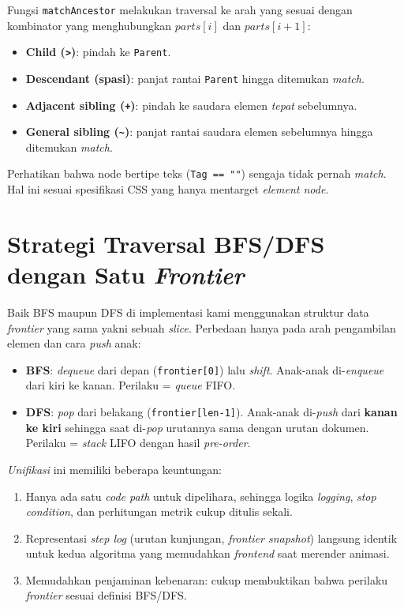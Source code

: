 Fungsi \texttt{matchAncestor} melakukan traversal ke arah yang sesuai dengan kombinator yang menghubungkan $\mathit{parts}[i]$ dan $\mathit{parts}[i+1]$:

\begin{itemize}
    \item \textbf{Child (\texttt{>})}: pindah ke \texttt{Parent}.
    \item \textbf{Descendant (spasi)}: panjat rantai \texttt{Parent} hingga ditemukan \textit{match}.
    \item \textbf{Adjacent sibling (\texttt{+})}: pindah ke saudara elemen \textit{tepat} sebelumnya.
    \item \textbf{General sibling (\texttt{\textasciitilde})}: panjat rantai saudara elemen sebelumnya hingga ditemukan \textit{match}.
\end{itemize}

Perhatikan bahwa node bertipe teks (\texttt{Tag == ""}) sengaja tidak pernah \textit{match}. Hal ini sesuai spesifikasi CSS yang hanya mentarget \textit{element node}.

\section{Strategi Traversal BFS/DFS dengan Satu \textit{Frontier}}

Baik BFS maupun DFS di implementasi kami menggunakan struktur data \textit{frontier} yang sama yakni sebuah \textit{slice}. Perbedaan hanya pada arah pengambilan elemen dan cara \textit{push} anak:

\begin{itemize}
    \item \textbf{BFS}: \textit{dequeue} dari depan (\texttt{frontier[0]}) lalu \textit{shift}. Anak-anak di-\textit{enqueue} dari kiri ke kanan. Perilaku = \textit{queue} FIFO.
    \item \textbf{DFS}: \textit{pop} dari belakang (\texttt{frontier[len-1]}). Anak-anak di-\textit{push} dari \textbf{kanan ke kiri} sehingga saat di-\textit{pop} urutannya sama dengan urutan dokumen. Perilaku = \textit{stack} LIFO dengan hasil \textit{pre-order}.
\end{itemize}

\textit{Unifikasi} ini memiliki beberapa keuntungan:
\begin{enumerate}
    \item Hanya ada satu \textit{code path} untuk dipelihara, sehingga logika \textit{logging}, \textit{stop condition}, dan perhitungan metrik cukup ditulis sekali.
    \item Representasi \textit{step log} (urutan kunjungan, \textit{frontier snapshot}) langsung identik untuk kedua algoritma yang memudahkan \textit{frontend} saat merender animasi.
    \item Memudahkan penjaminan kebenaran: cukup membuktikan bahwa perilaku \textit{frontier} sesuai definisi BFS/DFS.
\end{enumerate}

